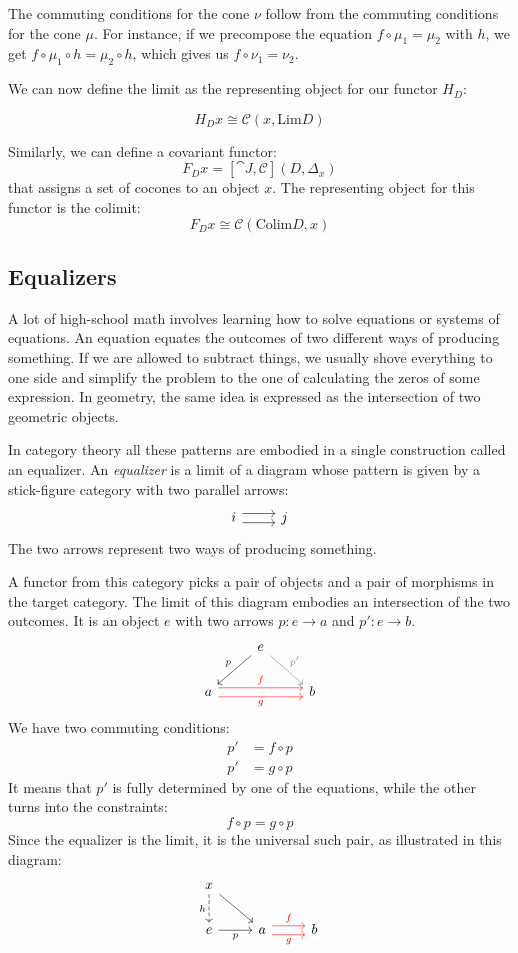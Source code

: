 \documentclass[DaoFP]{subfiles}
\begin{document}
The commuting conditions for the cone $\nu$ follow from the commuting conditions for the cone $\mu$. For instance, if we precompose the equation $f \circ \mu_1 = \mu_2$ with $h$, we get $f \circ \mu_1 \circ h = \mu_2 \circ h$, which gives us $f \circ \nu_1 = \nu_2$.

We can now define the limit as the representing object for our functor $H_D$:

\[ H_D x  \cong \mathcal{C}(x, \text{Lim}D) \]


Similarly, we can define a covariant functor:
\[ F_D x =  [\cat J, \mathcal{C}](D, \Delta_x)  \]
that assigns a set of cocones to an object $x$. The representing object for this functor is the colimit:
\[ F_D x  \cong \mathcal{C}( \text{Colim}D, x) \]


\subsection{Equalizers}

A lot of high-school math involves learning how to solve equations or systems of equations. An equation equates the outcomes of two different ways of producing something. If we are allowed to subtract things, we usually shove everything to one side and simplify the problem to the one of calculating the zeros of some expression. In geometry, the same idea is expressed as the intersection of two geometric objects.

In category theory all these patterns are embodied in a single construction called an equalizer. An \emph{equalizer} is a limit of a diagram whose pattern is given by a stick-figure category with two parallel arrows:
\[
\begin{tikzcd}
i \arrow[r, shift left=0.75ex]
  \arrow[r, shift right=0.75ex]
&
j
\end{tikzcd}
\]
The two arrows represent two ways of producing something. 

A functor from this category picks a pair of objects and a pair of morphisms in the target category. The limit of this diagram embodies an intersection of the two outcomes. It is an object $e$ with two arrows $p \colon e \to a$ and $p' \colon e \to b$.
\[
\begin{tikzcd}
& e
\arrow[dl, "p"']
\arrow[dr, gray, "p'"]
\\
a 
\arrow[rr, red, shift left=.75ex, "f"]
\arrow[rr, red, shift right=.75ex, "g"']
&&
b
\end{tikzcd}
\]
We have two commuting conditions:
\begin{align*}
p' &= f \circ p \\
p' &= g \circ p
\end{align*}
It means that $p'$ is fully determined by one of the equations, while the other turns into the constraints:
\[ f \circ p = g \circ p \]
Since the equalizer is the limit, it is the universal such pair, as illustrated in this diagram:
\[
\begin{tikzcd}
x
\arrow[d, dashed, "h"']
\arrow[dr, ""]
\\
e
\arrow[r, "p"']
&
a \arrow[r, red, shift left=0.75ex, "f"]
  \arrow[r, red, shift right=0.75ex, "g"']
&
b
\end{tikzcd}
\]
\end{document}
